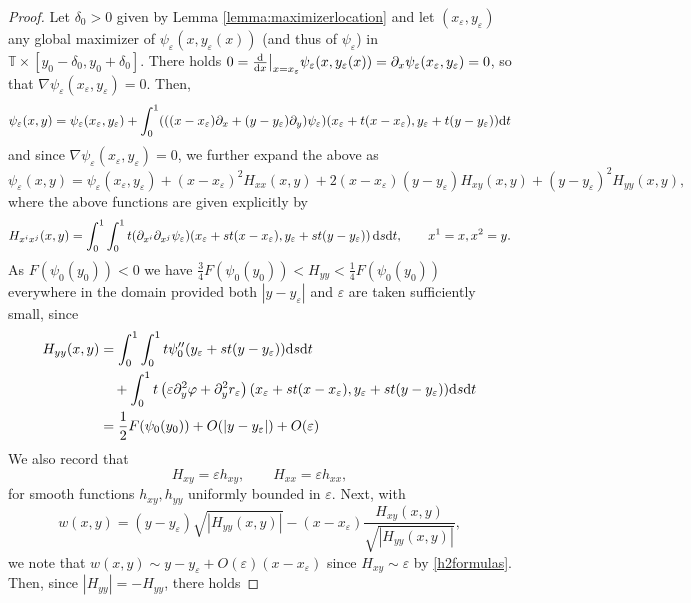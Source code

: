 \documentclass[11pt,reqno]{amsproc}
\newcommand{\pa}{\partial}
\newcommand{\ve}{\varepsilon}
\newcommand{\rmd}{{\rm d}}
\numberwithin{equation}{section}
\numberwithin{theorem}{section}
\numberwithin{prop}{section}
\numberwithin{cor}{section}
\numberwithin{lemma}{section}
\theoremstyle{remark}
\theoremstyle{definition}
\begin{document}
\begin{proof}
Let $\delta_0>0$ given by Lemma \ref{lemma:maximizerlocation} and let $(x_\ve,y_\ve)$ any global maximizer of $\psi_\ve(x,y_\ve(x))$ (and thus of $\psi_\ve$) in $\mathbb{T}\times[y_0-\delta_0,y_0+\delta_0]$. There holds $0=\frac{\rmd}{\rmd x}\big|_{x=x_\ve}\psi_\ve(x,y_\ve(x)) =\partial_x\psi_\ve(x_\ve,y_\ve) = 0$, so that $\nabla\psi_\ve(x_\ve, y_\ve) = 0$. Then, 
\begin{align*}
\psi_\ve(x,y) = \psi_\ve(x_\ve,y_\ve) + \int_0^1 (((x-x_\ve)\partial_x + (y-y_\ve)\partial_y)\psi_\ve) (x_\ve+t(x-x_\ve),y_\ve + t(y-y_\ve)) \rmd t
\end{align*}
and since $\nabla\psi_\ve(x_\ve,y_\ve)=0$, we further expand the above as
\begin{equation}
 \psi_\ve(x,y) = \psi_\ve(x_\ve,y_\ve) + (x-x_\ve)^2 H_{xx}(x,y) + 2(x-x_\ve)(y-y_\ve) H_{xy}(x,y)+ (y-y_\ve)^2 H_{yy}(x,y),
 \label{taylor}
\end{equation}
where the above functions are given explicitly by
\begin{equation}
 H_{x^ix^j}(x,y) = \int_{0}^1\int_0^1 t (\pa_{x^i}\pa_{x^j} \psi_\ve)(x_\ve + st(x-x_\ve), y_\ve + st(y-y_\ve))\, \rmd s \rmd t,
 \qquad
 x^1 = x, x^2 = y.
 \label{Hformula}
\end{equation}
As $F(\psi_0(y_0))<0$  we have $\frac34F(\psi_0(y_0)) < H_{yy} < \frac14 F(\psi_0(y_0))$ everywhere in the domain provided both $|y-y_\ve|$ and  $\ve$ are taken sufficiently small, since 
\begin{align*}
 H_{yy}(x,y) &= \int_0^1 \int_0^1  t \psi_0''(y_\ve +st(y-y_\ve)) \rmd s \rmd t \\
 &\quad+  \int_0^1 t \left( \ve\partial_y^2\varphi +\partial_y^2r_\ve \right)(x_\ve + st(x-x_\ve), y_\ve + st(y-y_\ve)) \rmd s \rmd t \\
 &= \frac{1}{2}F(\psi_0(y_0)) + O(|y-y_\ve|) + O(\ve)
\end{align*}
We also record that
\begin{equation}
 H_{xy} = \ve h_{xy},
 \qquad
 H_{xx} = \ve h_{xx},
 \label{h2formulas}
\end{equation}
for smooth functions $h_{xy}, h_{yy}$ uniformly bounded in $\ve$. Next, with
\begin{equation}
 w(x,y) =  (y-y_\ve)\sqrt{|H_{yy}(x,y)|} - (x-x_\ve) \frac{H_{xy}(x,y)}{\sqrt{|H_{yy}(x,y)|}},
\end{equation}
we note that $w(x,y) \sim y-y_\ve + O(\ve) (x-x_\ve)$ since $H_{xy} \sim \ve$ by \eqref{h2formulas}. Then, since $|H_{yy}| = -H_{yy}$, there holds

\end{proof}
\end{document}
